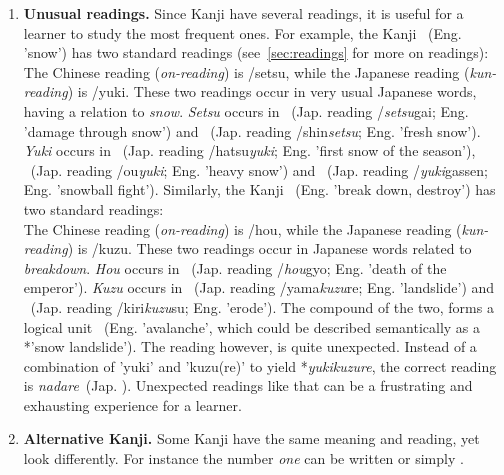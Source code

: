 \begin{enumerate}
  \item \textbf{Unusual readings.} Since Kanji have several readings, 
        it is useful for a learner to study the most frequent ones.
        For example, the Kanji ~(Eng. 'snow') has two 
        standard readings (see~\ref{sec:readings} for more on readings):\\
        The Chinese reading (\emph{on-reading}) is /setsu, 
        while the Japanese reading (\emph{kun-reading}) is /yuki.
        These two readings occur in very usual Japanese words, having a 
        relation to \emph{snow}. \emph{Setsu} occurs in
        ~(Jap. reading /\emph{setsu}gai; 
        Eng. 'damage through snow') and
        ~(Jap. reading /shin\emph{setsu}; 
        Eng. 'fresh snow').
        \emph{Yuki} occurs in
        ~(Jap. reading /hatsu\emph{yuki}; 
        Eng. 'first snow of the season'),
        ~(Jap. reading /ou\emph{yuki}; 
        Eng. 'heavy snow') and
        ~(Jap. reading /\emph{yuki}gassen; 
        Eng. 'snowball fight'). 
        Similarly, the Kanji ~(Eng. 'break down, destroy') 
        has two standard readings:\\
        The Chinese reading (\emph{on-reading}) is /hou, 
        while the Japanese reading (\emph{kun-reading}) is /kuzu.
        These two readings occur in Japanese words related to 
        \emph{breakdown}. \emph{Hou} occurs in 
        ~(Jap. reading /\emph{hou}gyo; 
        Eng. 'death of the emperor').
        \emph{Kuzu} occurs in 
        ~(Jap. reading /yama\emph{kuzu}re; 
        Eng. 'landslide') and 
        ~(Jap. reading /kiri\emph{kuzu}su; 
        Eng. 'erode').
        The compound of the two, forms a logical unit 
        ~(Eng. 'avalanche', which could be described semantically as a 
        *'snow landslide'). The reading however, is quite unexpected. Instead of
        a combination of 'yuki' and 'kuzu(re)' to yield *\emph{yukikuzure},
        the correct reading is \emph{nadare}~(Jap. ).
        Unexpected readings like that can be a frustrating and exhausting 
        experience for a learner. %
     
  \item \textbf{Alternative Kanji.} Some Kanji have the same meaning and reading,
        yet look differently. For instance the number \emph{one} can be written
         or simply .


\end{enumerate}
